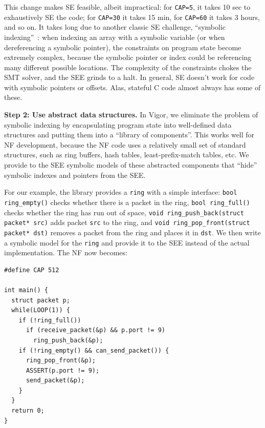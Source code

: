 \documentclass[letterpaper,twocolumn,10pt]{article}
\newcommand{\code}[1]{\lstinline{#1}}
\begin{document}
This change makes SE feasible, albeit impractical: for \code{CAP=5}, it takes 10 sec to exhaustively SE the code; for \code{CAP=30} it takes 15 min, for \code{CAP=60} it takes 3 hours, and so on. It takes long due to another classic SE challenge, ``symbolic indexing''~\cite{sen2005cute,godefroid2008automated,boonstoppel2008rwset}: when indexing an array with a symbolic variable (or when dereferencing a symbolic pointer), the constraints on program state become extremely complex, because the symbolic pointer or index could be referencing many different possible locations. The complexity of the constraints chokes the SMT solver, and the SEE grinds to a halt. In general, SE doesn't work for code with symbolic pointers or offsets. Alas, stateful C code almost always has some of these.

{\bf Step 2: Use abstract data structures.} In Vigor, we eliminate the problem of symbolic indexing by encapsulating program state into well-defined data structures and putting them into a ``library of components''. This works well for NF development, because the NF code uses a relatively small set of standard structures, such as ring buffers, hash tables, least-prefix-match tables, etc. We provide to the SEE symbolic models of these abstracted components that ``hide'' symbolic indexes and pointers from the SEE.

For our example, the library provides a \code{ring} with a simple interface: \code{bool ring_empty()} checks whether there is a packet in the ring, \code{bool ring_full()} checks whether the ring has run out of space, \code{void ring_push_back(struct packet* src)} adds packet \code{src} to the ring, and \code{void ring_pop_front(struct packet* dst)} removes a packet from the ring and places it in \code{dst}. We then write a symbolic model for the \code{ring} and provide it to the SEE instead of the actual implementation. The NF now becomes:





\begin{lstlisting}
#define CAP 512

int main() {
  struct packet p;
  while(LOOP(1)) {
    if (!ring_full())
      if (receive_packet(&p) && p.port != 9)
        ring_push_back(&p);
    if (!ring_empty() && can_send_packet()) {
      ring_pop_front(&p);
      ASSERT(p.port != 9);
      send_packet(&p);
    }
  }
  return 0;
}
\end{lstlisting}
\end{document}
